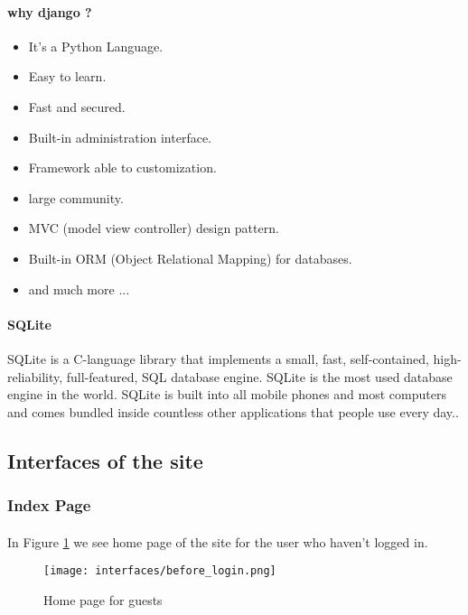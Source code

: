 			\paragraph{why django ?}
			\begin{itemize}
				\item It's a Python Language.
				\item Easy to learn.
				\item Fast and secured.
				\item Built-in administration interface.
				\item Framework able to customization.
				\item large community.
				\item MVC (model view controller) design pattern.
				\item Built-in ORM (Object Relational Mapping) for databases.
				\item and much more ...
			\end{itemize}
		
			\paragraph{SQLite}
			SQLite is a C-language library that implements a small, fast, self-contained, high-reliability, full-featured, SQL database engine. SQLite is the most used database engine in the world. SQLite is built into all mobile phones and most computers and comes bundled inside countless other applications that people use every day..\cite{SQLite}
	
	\subsection{Interfaces of the site}
	
	\subsubsection{Index Page}
		\paragraph{}
		In Figure \ref{fig:home-before-login} we see home page of the site for the user who haven't logged in.
		
		\begin{figure}[!ht]
			\centering
			\texttt{[image: interfaces/before\_login.png]}
			\caption{Home page for guests}
			\label{fig:home-before-login}
		\end{figure}

